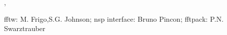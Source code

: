 
\begin{manseealso}
  , 
\end{manseealso}

\begin{authors}
   fftw: M. Frigo,S.G. Johnson;  nsp interface: Bruno Pincon; fftpack: P.N. Swarztrauber
\end{authors}

